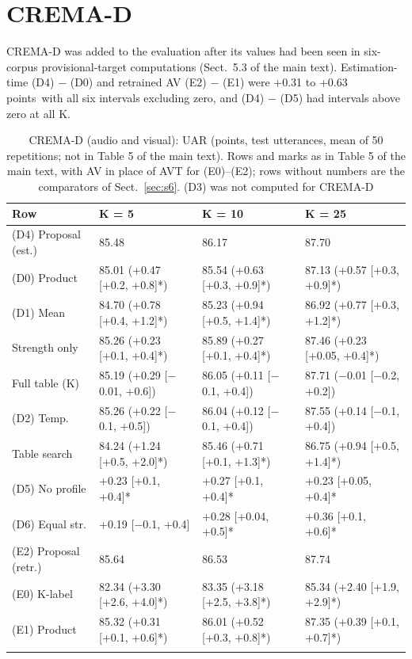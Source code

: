 \documentclass[sn-nature,pdflatex]{sn-jnl}
\newcommand{\pt}{\,points}
\begin{document}
\section{CREMA-D}\label{sec:s7}
CREMA-D was added to the evaluation after its values had been seen in six-corpus provisional-target computations (Sect.~5.3 of the main text). Estimation-time (D4) $-$ (D0) and retrained AV (E2) $-$ (E1) were +0.31 to +0.63\pt\ with all six intervals excluding zero, and (D4) $-$ (D5) had intervals above zero at all K.

\begin{table}[h]
\caption{CREMA-D (audio and visual): UAR (points, test utterances, mean of 50 repetitions; not in Table 5 of the main text). Rows and marks as in Table 5 of the main text, with AV in place of AVT for (E0)--(E2); rows without numbers are the comparators of Sect.~\ref{sec:s6}. (D3) was not computed for CREMA-D}\label{tab:s3}
\footnotesize\setlength{\tabcolsep}{1pt}
\begin{tabular}{@{}llll@{}}
\toprule
Row & K = 5 & K = 10 & K = 25 \\
\midrule
(D4) Proposal (est.) & 85.48 & 86.17 & 87.70 \\
(D0) Product & 85.01 (+0.47 [+0.2, +0.8]*) & 85.54 (+0.63 [+0.3, +0.9]*) & 87.13 (+0.57 [+0.3, +0.9]*) \\
(D1) Mean & 84.70 (+0.78 [+0.4, +1.2]*) & 85.23 (+0.94 [+0.5, +1.4]*) & 86.92 (+0.77 [+0.3, +1.2]*) \\
Strength only & 85.26 (+0.23 [+0.1, +0.4]*) & 85.89 (+0.27 [+0.1, +0.4]*) & 87.46 (+0.23 [+0.05, +0.4]*) \\
Full table (K) & 85.19 (+0.29 [$-$0.01, +0.6]) & 86.05 (+0.11 [$-$0.1, +0.4]) & 87.71 ($-$0.01 [$-$0.2, +0.2]) \\
(D2) Temp. & 85.26 (+0.22 [$-$0.1, +0.5]) & 86.04 (+0.12 [$-$0.1, +0.4]) & 87.55 (+0.14 [$-$0.1, +0.4]) \\
Table search & 84.24 (+1.24 [+0.5, +2.0]*) & 85.46 (+0.71 [+0.1, +1.3]*) & 86.75 (+0.94 [+0.5, +1.4]*) \\
(D5) No profile & +0.23 [+0.1, +0.4]* & +0.27 [+0.1, +0.4]* & +0.23 [+0.05, +0.4]* \\
(D6) Equal str. & +0.19 [$-$0.1, +0.4] & +0.28 [+0.04, +0.5]* & +0.36 [+0.1, +0.6]* \\
(E2) Proposal (retr.) & 85.64 & 86.53 & 87.74 \\
(E0) K-label & 82.34 (+3.30 [+2.6, +4.0]*) & 83.35 (+3.18 [+2.5, +3.8]*) & 85.34 (+2.40 [+1.9, +2.9]*) \\
(E1) Product & 85.32 (+0.31 [+0.1, +0.6]*) & 86.01 (+0.52 [+0.3, +0.8]*) & 87.35 (+0.39 [+0.1, +0.7]*) \\

\botrule
\end{tabular}
\end{table}


\end{document}
